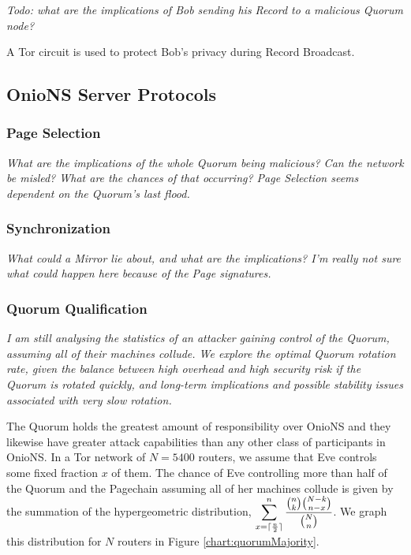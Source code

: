 \emph{Todo: what are the implications of Bob sending his Record to a malicious Quorum node?}

A Tor circuit is used to protect Bob's privacy during Record Broadcast.

\subsection{OnioNS Server Protocols}

\subsubsection{Page Selection}

\emph{What are the implications of the whole Quorum being malicious? Can the network be misled? What are the chances of that occurring? Page Selection seems dependent on the Quorum's last flood.}

\subsubsection{Synchronization}

\emph{What could a Mirror lie about, and what are the implications? I'm really not sure what could happen here because of the Page signatures.}

\subsubsection{Quorum Qualification}

\emph{I am still analysing the statistics of an attacker gaining control of the Quorum, assuming all of their machines collude. We explore the optimal Quorum rotation rate, given the balance between high overhead and high security risk if the Quorum is rotated quickly, and long-term implications and possible stability issues associated with very slow rotation.}

The Quorum holds the greatest amount of responsibility over OnioNS and they likewise have greater attack capabilities than any other class of participants in OnioNS. In a Tor network of $ N = 5400 $ routers, we assume that Eve controls some fixed fraction $ x $ of them. The chance of Eve controlling more than half of the Quorum and the Pagechain assuming all of her machines collude is given by the summation of the hypergeometric distribution, $ \displaystyle\sum_{x=\lceil\frac{n}{2}\rceil}^{n} \frac{\binom{n}{k}\binom{N-k}{n-x}}{\binom{N}{n}} $. We graph this distribution for $ N $ routers in Figure \ref{chart:quorumMajority}.

